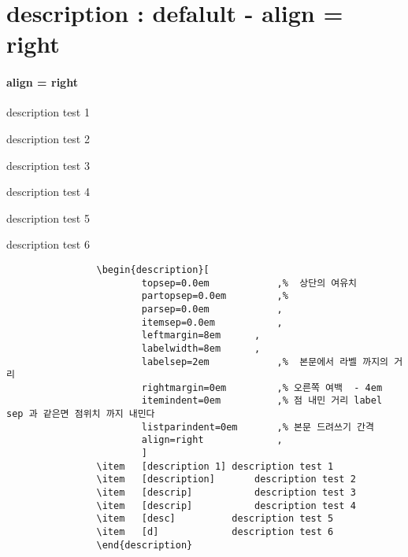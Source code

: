\documentclass[12pt, a4paper, oneside]{book}
\let\stdsection\section
\renewcommand\section{\newpage\stdsection}
\begin{document}
	\section{description : defalult - align = right}
			\paragraph{ align = right }
				\begin{description}[
						topsep=0.0em 			,%
						partopsep=0.0em 		,%
						parsep=0.0em 			, 
						itemsep=0.0em 			, 
						leftmargin=8em 		,
						labelwidth=8em 		, 
						labelsep=2em 			,%
						rightmargin=0em 		,%
						itemindent=0em 			,%
						listparindent=0em 		,%
						align=right				,
						]
				\item	[description 1]	description test 1
				\item	[description]		description test 2
				\item	[descrip]			description test 3
				\item	[descrip]			description test 4
				\item	[desc]			description test 5
				\item	[d]				description test 6
				\end{description}

		\begin{mdframed}[style=code_document, frametitle={code}]
			\begin{verbatim}
				\begin{description}[
						topsep=0.0em 			,%  상단의 여유치
						partopsep=0.0em 		,%  
						parsep=0.0em 			, 
						itemsep=0.0em 			, 
						leftmargin=8em 		,
						labelwidth=8em 		, 
						labelsep=2em 			,%  본문에서 라벨 까지의 거리
						rightmargin=0em 		,% 오른쪽 여백  - 4em
						itemindent=0em 			,% 점 내민 거리 label sep 과 같은면 점위치 까지 내민다
						listparindent=0em 		,% 본문 드려쓰기 간격
						align=right				,
						]
				\item	[description 1]	description test 1
				\item	[description]		description test 2
				\item	[descrip]			description test 3
				\item	[descrip]			description test 4
				\item	[desc]			description test 5
				\item	[d]				description test 6
				\end{description}
			\end{verbatim}
		\end{mdframed}
\end{document}
